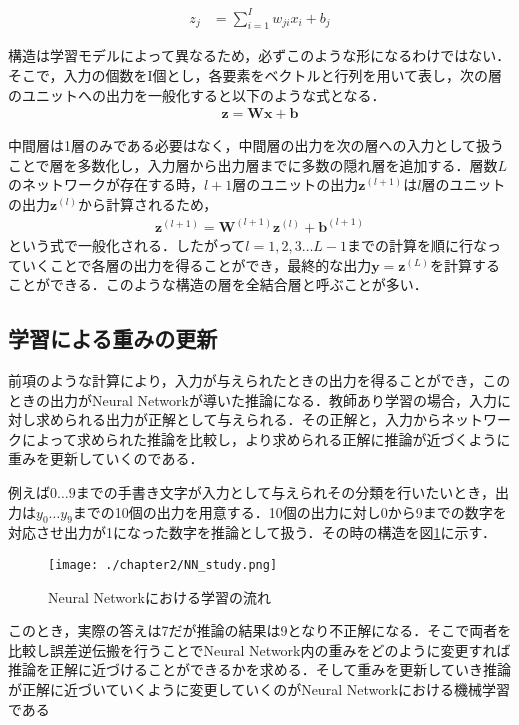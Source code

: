 \begin{align}
z_{j} &= \sum^{I}_{i=1}w_{ji}x_{i} + b_j
\end{align}

構造は学習モデルによって異なるため，必ずこのような形になるわけではない．そこで，入力の個数をI個とし，各要素をベクトルと行列を用いて表し，次の層のユニットへの出力を一般化すると以下のような式となる．
\begin{align}
\bm{z} = \bm{W}\bm{x} + \bm{b}
\end{align}

中間層は1層のみである必要はなく，中間層の出力を次の層への入力として扱うことで層を多数化し，入力層から出力層までに多数の隠れ層を追加する．層数$L$のネットワークが存在する時，$l+1$層のユニットの出力$\bm{z}^{(l+1)}$は$l$層のユニットの出力$\bm{z}^{(l)}$から計算されるため，
\begin{align}
\bm{z}^{(l+1)} = \bm{W}^{(l+1)}\bm{z}^{(l)} + \bm{b}^{(l+1)}
\end{align}
という式で一般化される．したがって$l=1,2,3\ldots L-1$までの計算を順に行なっていくことで各層の出力を得ることができ，最終的な出力$\bm{y}=\bm{z}^{(L)}$を計算することができる．このような構造の層を全結合層と呼ぶことが多い．


\subsection{学習による重みの更新}
前項のような計算により，入力が与えられたときの出力を得ることができ，このときの出力がNeural Networkが導いた推論になる．教師あり学習の場合，入力に対し求められる出力が正解として与えられる．その正解と，入力からネットワークによって求められた推論を比較し，より求められる正解に推論が近づくように重みを更新していくのである．

例えば$0 \ldots 9$までの手書き文字が入力として与えられその分類を行いたいとき，出力は$y_0 \ldots y_9$までの10個の出力を用意する．10個の出力に対し0から9までの数字を対応させ出力が1になった数字を推論として扱う．その時の構造を図\ref{fig_study}に示す．
\begin{figure}[htbp]
  \begin{center}
    \texttt{[image: ./chapter2/NN\_study.png]}
    \caption{Neural Networkにおける学習の流れ}
    \label{fig_study}
  \end{center}
\end{figure}

このとき，実際の答えは7だが推論の結果は9となり不正解になる．そこで両者を比較し誤差逆伝搬を行うことでNeural Network内の重みをどのように変更すれば推論を正解に近づけることができるかを求める．そして重みを更新していき推論が正解に近づいていくように変更していくのがNeural Networkにおける機械学習である

